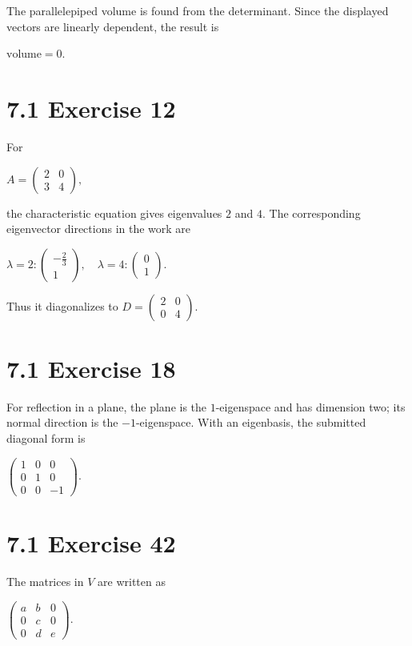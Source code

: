The parallelepiped volume is found from the determinant. Since the displayed vectors are linearly dependent, the result is

\(\text{volume} = 0.\)

\section{7.1 Exercise 12}

For

\(A = \begin{pmatrix}
2 & 0 \\
3 & 4
\end{pmatrix},\)

the characteristic equation gives eigenvalues \(2\) and \(4\). The corresponding eigenvector directions in the work are

\(\lambda = 2:\begin{pmatrix}
{- \frac{2}{3}} \\
1
\end{pmatrix},\quad\lambda = 4:\begin{pmatrix}
0 \\
1
\end{pmatrix}.\)

Thus it diagonalizes to \(D = \begin{pmatrix}
2 & 0 \\
0 & 4
\end{pmatrix}\).

\section{7.1 Exercise 18}

For reflection in a plane, the plane is the \(1\)-eigenspace and has dimension two; its normal direction is the \(- 1\)-eigenspace. With an eigenbasis, the submitted diagonal form is

\(\begin{pmatrix}
1 & 0 & 0 \\
0 & 1 & 0 \\
0 & 0 & {- 1}
\end{pmatrix}.\)

\section{7.1 Exercise 42}

The matrices in \(V\) are written as

\(\begin{pmatrix}
a & b & 0 \\
0 & c & 0 \\
0 & d & e
\end{pmatrix}.\)

